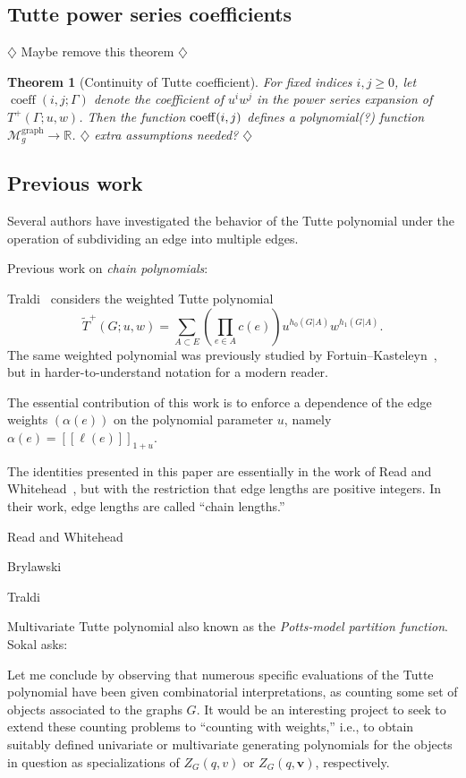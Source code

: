 \documentclass{amsart}
\newtheorem{thm}{Theorem}
\theoremstyle{definition}
\newcommand{\RR}{\mathbb{R}}
\DeclareMathOperator{\coeff}{coeff}
\newcommand{\fanalog}[2]{[\![#2]\!]_{#1}}
\newcommand{\Mgraphg}{\mathcal M_g^{\mathrm{graph}}}
\newcommand{\harry}[1]{{\color{red} \sf $\diamondsuit$  {#1} $\diamondsuit$ }}
\newcommand{\note}[1]{\harry{#1}}
\begin{document}
\subsection{Tutte power series coefficients}
\note{Maybe remove this theorem}
\begin{thm}[Continuity of Tutte coefficient]
For fixed indices $i,j\geq 0$,
let $\coeff(i,j; \Gamma)$
denote the coefficient of $u^i w^j$ in the power series expansion of $T^+(\Gamma; u,w)$.
Then the function ${\rm coeff}(i,j)$
defines a polynomial(?) 
function $\Mgraphg \to \RR$.
\note{extra assumptions needed?}
\end{thm}

\subsection{Previous work} 

Several authors have investigated the behavior of the Tutte polynomial under the operation of subdividing an edge into multiple edges.

Previous work on {\em chain polynomials}:

Traldi~\cite{Tra1} considers the weighted Tutte polynomial
\[
	\widetilde T^+(G; u,w) = \sum_{A \subset E} \left( \prod_{e \in A} c(e) \right) u^{h_0(G|A)} w^{h_1(G|A)} .
\]
The same weighted polynomial was previously studied by Fortuin--Kasteleyn~\cite{FK}, but in harder-to-understand notation for a modern reader.

The essential contribution of this work is to enforce a dependence of the edge weights $(\alpha(e))$ on the polynomial parameter $u$, namely $\alpha(e) = \fanalog{1 + u}{\ell(e)}$.


The identities presented in this paper are essentially in the work of Read and Whitehead~\cite{RW2}, but with the restriction that edge lengths are positive integers. In their work, edge lengths are called ``chain lengths.''

Read and Whitehead \cite{RW2}
\cite{RW1,RW2}

Brylawski \cite{Bry}

Traldi \cite{Tra1,Tra2,Tra3}

Multivariate Tutte polynomial \cite{Sok-potts}
also known as the {\em Potts-model partition function}.
Sokal \cite{Sok-potts} asks:
\begin{displayquote}
Let me conclude by observing that numerous specific evaluations of the Tutte polynomial have been given combinatorial interpretations, 
as counting some set of objects associated to the graphs $G$. 
It would be an interesting project to seek to extend these counting problems to ``counting with weights,''
i.e., to obtain suitably defined univariate or multivariate generating polynomials for the objects in question as specializations of 
$Z_G(q,v)$ or $Z_G(q,\mathbf{v})$, respectively.
\end{displayquote}
\end{document}

